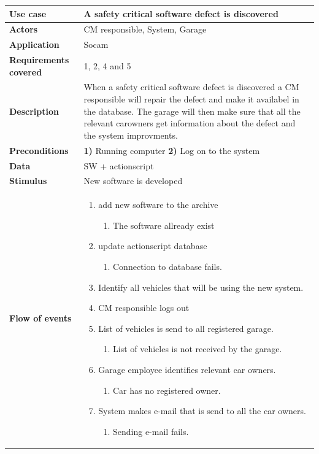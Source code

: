 	\begin{table}[H]
		\begin{tabular}{ p{4cm} | p{10cm} }
			\hline
			\rowcolor{gray}
			{\bf Use case} & {\bf A safety critical software defect is discovered} \\ \hline
			{\bf Actors} & CM responsible, System, Garage \\ \hline
			{\bf Application} & Socam \\ \hline
			{\bf Requirements covered} & 1, 2, 4 and 5\\ \hline
			{\bf Description} & When a safety critical software defect is discovered a CM 
			responsible will repair the defect and make it availabel in the database. 
			The garage will then make sure that all the relevant carowners get information 
			about the defect and the system improvments.\\ \hline
			{\bf Preconditions} & {\bf 1)} Running computer {\bf 2)} Log on to the system \\ \hline
			{\bf Data} & SW + actionscript \\ \hline
			{\bf Stimulus} & New software is developed \\ \hline
			{\bf Flow of events} & 
				\begin{enumerate}[font=\bfseries]
					\item add new software to the archive
						\begin{enumerate}[label*=\arabic*., font=\bfseries]
							\item The software allready exist 
						\end{enumerate}
					\item update actionscript database
						\begin{enumerate}[label*=\arabic*., font=\bfseries]
							\item Connection to database fails. 
						\end{enumerate}
					\item Identify all vehicles that will be using the new system.
					\item CM responsible logs out
					\item List of vehicles is send to all registered garage.
						\begin{enumerate}[label*=\arabic*., font=\bfseries]
							\item  List of vehicles is not received by the garage.
						\end{enumerate}
					\item Garage employee identifies relevant car owners.
						\begin{enumerate}[label*=\arabic*., font=\bfseries]
							\item Car has no registered owner.
						\end{enumerate}
					\item System makes e-mail that is send to all the car owners.
						\begin{enumerate}[label*=\arabic*., font=\bfseries]
							\item Sending e-mail fails.
						\end{enumerate}
				\end{enumerate}
			

\end{tabular}
\end{table}

